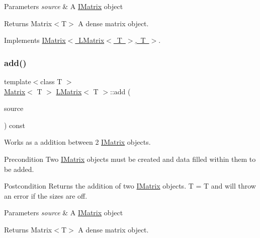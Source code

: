 \begin{DoxyParams}{Parameters}
{\em source} & A \mbox{\hyperlink{class_i_matrix}{I\+Matrix}} object \\
\hline
\end{DoxyParams}
\begin{DoxyReturn}{Returns}
Matrix$<$\+T$>$ A dense matrix object. 
\end{DoxyReturn}


Implements \mbox{\hyperlink{class_i_matrix_a661dc43bb607b98c28414cdd49bc64f7}{I\+Matrix$<$ L\+Matrix$<$ T $>$, T $>$}}.

\mbox{\label{class_l_matrix_a4450ca0e1d32b594d1c1a0da607fed97}} 
\subsubsection{\texorpdfstring{add()}{add()}\hspace{0.1cm}{\footnotesize\ttfamily [4/6]}}
{\footnotesize\ttfamily template$<$class T $>$ \\
\mbox{\hyperlink{class_matrix}{Matrix}}$<$ T $>$ \mbox{\hyperlink{class_l_matrix}{L\+Matrix}}$<$ T $>$\+::add (\begin{DoxyParamCaption}\item[{const \mbox{\hyperlink{class_i_matrix}{I\+Matrix}}$<$ \mbox{\hyperlink{class_u_matrix}{U\+Matrix}}$<$ T $>$, T $>$ \&}]{source }\end{DoxyParamCaption}) const}



Works as a addition between 2 \mbox{\hyperlink{class_i_matrix}{I\+Matrix}} objects. 

\begin{DoxyPrecond}{Precondition}
Two \mbox{\hyperlink{class_i_matrix}{I\+Matrix}} objects must be created and data filled within them to be added. 
\end{DoxyPrecond}
\begin{DoxyPostcond}{Postcondition}
Returns the addition of two \mbox{\hyperlink{class_i_matrix}{I\+Matrix}} objects. T = T and will throw an error if the sizes are off.
\end{DoxyPostcond}

\begin{DoxyParams}{Parameters}
{\em source} & A \mbox{\hyperlink{class_i_matrix}{I\+Matrix}} object \\
\hline
\end{DoxyParams}
\begin{DoxyReturn}{Returns}
Matrix$<$\+T$>$ A dense matrix object. 
\end{DoxyReturn}
\mbox{\label{class_l_matrix_acf28d86e7b4cd0552bbf70e66f38b09e}} 
